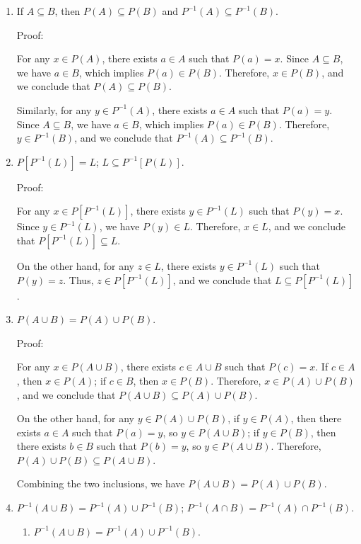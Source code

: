 \documentclass{article}
\begin{document}
\begin{enumerate}
  \item If $A \subseteq B$, then $P(A) \subseteq P(B)$ and $P^{-1}(A) \subseteq P^{-1}(B)$.
  
  Proof:
  
  For any $x \in P(A)$, there exists $a \in A$ such that $P(a) = x$. Since $A \subseteq B$, we have $a \in B$, which implies $P(a) \in P(B)$. Therefore, $x \in P(B)$, and we conclude that $P(A) \subseteq P(B)$.
  
  Similarly, for any $y \in P^{-1}(A)$, there exists $a \in A$ such that $P(a) = y$. Since $A \subseteq B$, we have $a \in B$, which implies $P(a) \in P(B)$. Therefore, $y \in P^{-1}(B)$, and we conclude that $P^{-1}(A) \subseteq P^{-1}(B)$.
  
  \item $P[P^{-1}(L)] = L$; $L \subseteq P^{-1}[P(L)]$.
  
  Proof:
  
  For any $x \in P[P^{-1}(L)]$, there exists $y \in P^{-1}(L)$ such that $P(y) = x$. Since $y \in P^{-1}(L)$, we have $P(y) \in L$. Therefore, $x \in L$, and we conclude that $P[P^{-1}(L)] \subseteq L$.
  
  On the other hand, for any $z \in L$, there exists $y \in P^{-1}(L)$ such that $P(y) = z$. Thus, $z \in P[P^{-1}(L)]$, and we conclude that $L \subseteq P[P^{-1}(L)]$.
  
  \item $P(A \cup B) = P(A) \cup P(B)$.
  
  Proof:
  
  For any $x \in P(A \cup B)$, there exists $c \in A \cup B$ such that $P(c) = x$. If $c \in A$, then $x \in P(A)$; if $c \in B$, then $x \in P(B)$. Therefore, $x \in P(A) \cup P(B)$, and we conclude that $P(A \cup B) \subseteq P(A) \cup P(B)$.
  
  On the other hand, for any $y \in P(A) \cup P(B)$, if $y \in P(A)$, then there exists $a \in A$ such that $P(a) = y$, so $y \in P(A \cup B)$; if $y \in P(B)$, then there exists $b \in B$ such that $P(b) = y$, so $y \in P(A \cup B)$. Therefore, $P(A) \cup P(B) \subseteq P(A \cup B)$.
  
  Combining the two inclusions, we have $P(A \cup B) = P(A) \cup P(B)$.
  
  \item $P^{-1}(A \cup B) = P^{-1}(A) \cup P^{-1}(B)$; $P^{-1}(A \cap B) = P^{-1}(A) \cap P^{-1}(B)$.
  
  \begin{enumerate}
    \item $P^{-1}(A \cup B) = P^{-1}(A) \cup P^{-1}(B)$.
    

\end{enumerate}
\end{enumerate}
\end{document}
